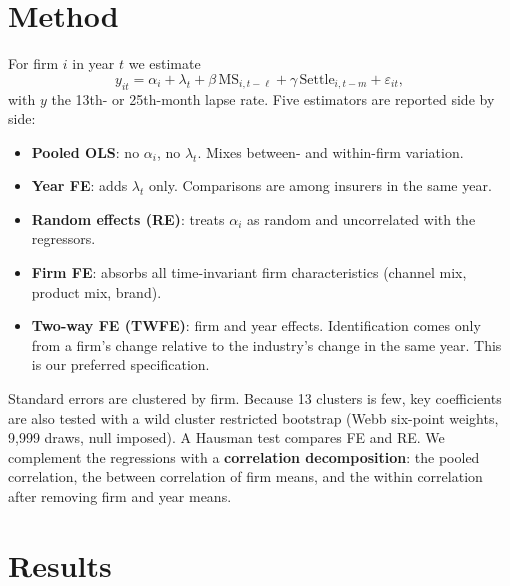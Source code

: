 \documentclass[11pt,a4paper]{article}
\begin{document}
\section{Method}
For firm $i$ in year $t$ we estimate
\begin{equation}
  y_{it} = \alpha_i + \lambda_t + \beta\,\mathrm{MS}_{i,t-\ell} + \gamma\,\mathrm{Settle}_{i,t-m} + \varepsilon_{it},
\end{equation}
with $y$ the 13th- or 25th-month lapse rate. Five estimators are reported side by side:
\begin{itemize}
  \item \textbf{Pooled OLS}: no $\alpha_i$, no $\lambda_t$. Mixes between- and within-firm variation.
  \item \textbf{Year FE}: adds $\lambda_t$ only. Comparisons are among insurers in the same year.
  \item \textbf{Random effects (RE)}: treats $\alpha_i$ as random and uncorrelated with the regressors.
  \item \textbf{Firm FE}: absorbs all time-invariant firm characteristics (channel mix, product mix, brand).
  \item \textbf{Two-way FE (TWFE)}: firm and year effects. Identification comes only from a firm's change
        relative to the industry's change in the same year. This is our preferred specification.
\end{itemize}
Standard errors are clustered by firm. Because 13 clusters is few, key coefficients are also tested with a
wild cluster restricted bootstrap (Webb six-point weights, 9{,}999 draws, null imposed). A Hausman test
compares FE and RE. We complement the regressions with a \textbf{correlation decomposition}: the pooled
correlation, the between correlation of firm means, and the within correlation after removing firm and year means.

\section{Results}
\end{document}
